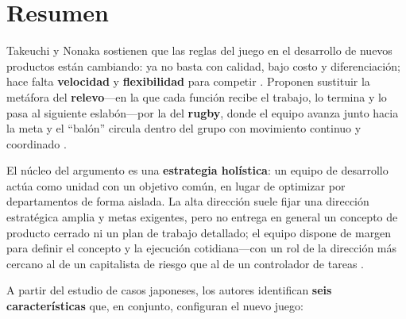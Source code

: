 \documentclass[conference]{IEEEtran}
\begin{document}
\section{Resumen}

Takeuchi y Nonaka sostienen que las reglas del juego en el desarrollo de nuevos productos están cambiando: ya no basta con calidad, bajo costo y diferenciación; hace falta \textbf{velocidad} y \textbf{flexibilidad} para competir \cite{takeuchiNonaka1986nndp}. Proponen sustituir la metáfora del \textbf{relevo}---en la que cada función recibe el trabajo, lo termina y lo pasa al siguiente eslabón---por la del \textbf{rugby}, donde el equipo avanza junto hacia la meta y el ``balón'' circula dentro del grupo con movimiento continuo y coordinado \cite{takeuchiNonaka1986nndp}.

El núcleo del argumento es una \textbf{estrategia holística}: un equipo de desarrollo actúa como unidad con un objetivo común, en lugar de optimizar por departamentos de forma aislada. La alta dirección suele fijar una dirección estratégica amplia y metas exigentes, pero no entrega en general un concepto de producto cerrado ni un plan de trabajo detallado; el equipo dispone de margen para definir el concepto y la ejecución cotidiana---con un rol de la dirección más cercano al de un capitalista de riesgo que al de un controlador de tareas \cite{takeuchiNonaka1986nndp}.

A partir del estudio de casos japoneses, los autores identifican \textbf{seis características} que, en conjunto, configuran el nuevo juego:
\end{document}
